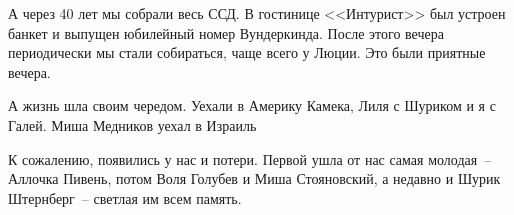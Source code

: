 А через 40 лет мы собрали весь ССД. В гостинице <<Интурист>> был устроен банкет и выпущен юбилейный номер Вундеркинда. После этого вечера периодически мы стали собираться, чаще всего у Люции. Это были приятные вечера.

А жизнь шла своим чередом. Уехали в Америку Камека, Лиля с Шуриком и я с Галей. Миша Медников уехал в Израиль

К сожалению, появились у нас и потери. Первой ушла от нас самая молодая~-- Аллочка Пивень, потом Воля Голубев и Миша Стояновский, а недавно и Шурик Штернберг~-- светлая им всем память.


